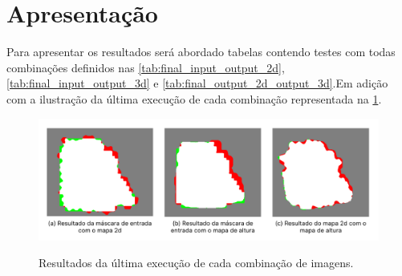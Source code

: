 \section{Apresentação}

Para apresentar os resultados será abordado tabelas contendo testes com todas combinações definidos nas \cref{tab:final_input_output_2d}, \cref{tab:final_input_output_3d} e \cref{tab:final_output_2d_output_3d}.Em adição com a ilustração da última  execução de cada combinação representada na \cref{fig:combs_result}.



\begin{figure}[!ht]
	\centering
    \caption{Resultados da última execução de cada combinação de imagens.}
	\includegraphics[width=\textwidth]{figures/comb_results_final.png}
	\label{fig:combs_result}
\end{figure}


